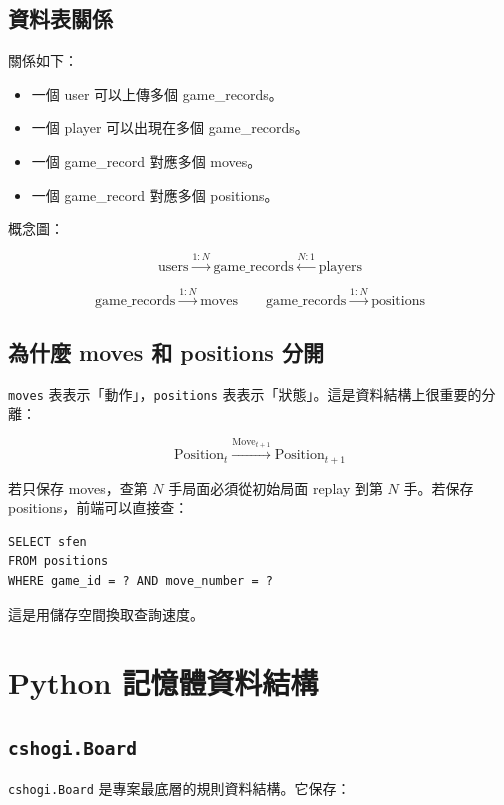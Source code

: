 \documentclass[12pt,a4paper,fontset=none]{ctexart}
\begin{document}
\subsection{資料表關係}

關係如下：

\begin{itemize}
  \item 一個 user 可以上傳多個 game\_records。
  \item 一個 player 可以出現在多個 game\_records。
  \item 一個 game\_record 對應多個 moves。
  \item 一個 game\_record 對應多個 positions。
\end{itemize}

概念圖：

\[
\text{users}
\xrightarrow{1:N}
\text{game\_records}
\xleftarrow{N:1}
\text{players}
\]

\[
\text{game\_records}
\xrightarrow{1:N}
\text{moves}
\qquad
\text{game\_records}
\xrightarrow{1:N}
\text{positions}
\]

\subsection{為什麼 moves 和 positions 分開}

\texttt{moves} 表表示「動作」，\texttt{positions} 表表示「狀態」。這是資料結構上很重要的分離：

\[
\text{Position}_{t}
\xrightarrow{\text{Move}_{t+1}}
\text{Position}_{t+1}
\]

若只保存 moves，查第 $N$ 手局面必須從初始局面 replay 到第 $N$ 手。若保存 positions，前端可以直接查：

\begin{lstlisting}[style=cmd]
SELECT sfen
FROM positions
WHERE game_id = ? AND move_number = ?
\end{lstlisting}

這是用儲存空間換取查詢速度。

\section{Python 記憶體資料結構}

\subsection{\texttt{cshogi.Board}}

\texttt{cshogi.Board} 是專案最底層的規則資料結構。它保存：
\end{document}
